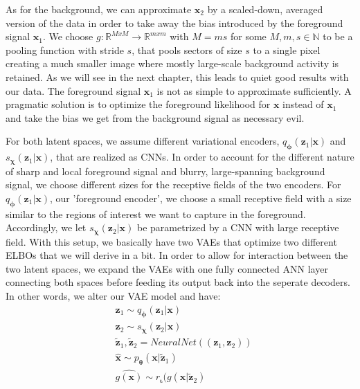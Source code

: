 \documentclass[12pt]{report}
\theoremstyle{definition}
\begin{document}
As for the background, we can approximate $\mathbf{x}_2$ by a scaled-down, averaged version of the data in order to take away the bias introduced by the foreground signal $\mathbf{x}_1$. We choose $g: \mathbb{R}^{MxM} \rightarrow \mathbb{R}^{mxm}$ with $M=ms$ for some $M, m, s \in \mathbb{N}$ to be a pooling function with stride $s$, that pools sectors of size $s$ to a single pixel creating a much smaller image where mostly large-scale background activity is retained. As we will see in the next chapter, this leads to quiet good results with our data. 
The foreground signal $\mathbf{x}_1$ is not as simple to approximate sufficiently. A pragmatic solution is to optimize the foreground likelihood for $\mathbf{x}$ instead of $\mathbf{x}_1$ and take the bias we get from the background signal as necessary evil.

For both latent spaces, we assume different variational encoders, $q_{\mathbf{\phi}}(\mathbf{z}_1|\mathbf{x})$ and $s_{\mathbf{\chi}}(\mathbf{z}_1|\mathbf{x})$, that are realized as CNNs. In order to account for the different nature of sharp and local foreground signal and blurry, large-spanning background signal, we choose different sizes for the receptive fields of the two encoders. For $q_{\mathbf{\phi}}(\mathbf{z}_1|\mathbf{x})$, our 'foreground encoder', we choose a small receptive field with a size similar to the regions of interest we want to capture in the foreground. Accordingly, we let $s_{\mathbf{\chi}}(\mathbf{z}_2|\mathbf{x})$ be parametrized by a CNN with large receptive field. With this setup, we basically have two VAEs that optimize two different ELBOs that we will derive in a bit. In order to allow for interaction between the two latent spaces, we expand the VAEs with one fully connected ANN layer connecting both spaces before feeding its output back into the seperate decoders. In other words, we alter our VAE model and have:
\begin{equation}
\begin{split}
& \mathbf{z}_1 \sim q_{\mathbf{\phi}}(\mathbf{z}_1|\mathbf{x}) \\
& \mathbf{z}_2 \sim s_{\mathbf{\chi}}(\mathbf{z}_2|\mathbf{x}) \\
& \tilde{\mathbf{z}}_1, \tilde{\mathbf{z}}_2 = NeuralNet((\mathbf{z}_1, \mathbf{z}_2)) \\
& \hat{\mathbf{x}} \sim p_{\mathbf{\theta}}(\mathbf{x}|\tilde{\mathbf{z}}_1) \\ 
& \hat{g(\mathbf{x})} \sim r_{\mathbf{\iota}}(g(\mathbf{x}|\tilde{\mathbf{z}}_2)
\end{split}
\end{equation}
\end{document}
